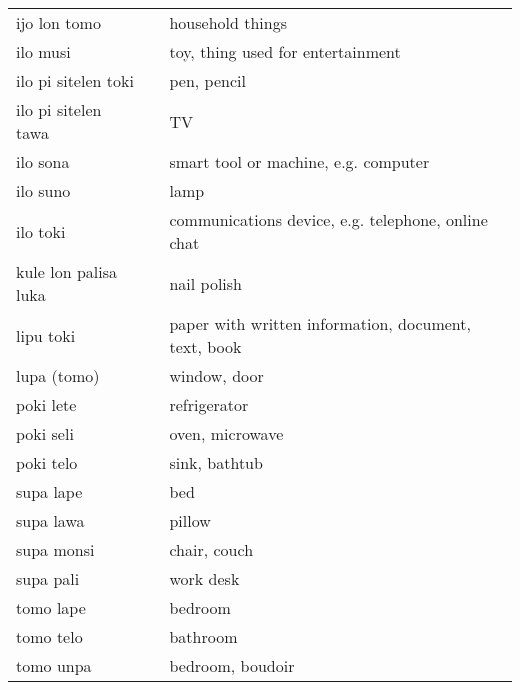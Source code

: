 \begin{supertabular}{p{4,5cm}|ll}
    ijo lon tomo         &  & household things                                     \\
    ilo musi             &  & toy, thing used for entertainment                    \\
    ilo pi sitelen toki  &  & pen, pencil                                          \\
    ilo pi sitelen tawa  &  & TV                                                   \\
    ilo sona             &  & smart tool or machine, e.g. computer                 \\
    ilo suno             &  & lamp                                                 \\
    ilo toki             &  & communications device, e.g. telephone, online chat   \\
    kule lon palisa luka &  & nail polish                                          \\
    lipu toki            &  & paper with written information, document, text, book \\
    lupa (tomo)          &  & window, door                                         \\
    poki lete            &  & refrigerator                                         \\
    poki seli            &  & oven, microwave                                      \\
    poki telo            &  & sink, bathtub                                        \\
    supa lape            &  & bed                                                  \\
    supa lawa            &  & pillow                                               \\
    supa monsi           &  & chair, couch                                         \\
    supa pali            &  & work desk                                            \\
    tomo lape            &  & bedroom                                              \\
    tomo telo            &  & bathroom                                             \\
    tomo unpa            &  & bedroom, boudoir                                     \\
\end{supertabular} \\

